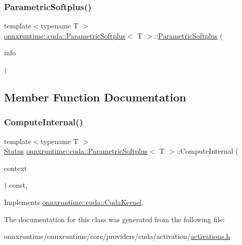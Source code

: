 \subsubsection{\texorpdfstring{Parametric\+Softplus()}{ParametricSoftplus()}}
{\footnotesize\ttfamily template$<$typename T $>$ \\
\mbox{\hyperlink{classonnxruntime_1_1cuda_1_1ParametricSoftplus}{onnxruntime\+::cuda\+::\+Parametric\+Softplus}}$<$ T $>$\+::\mbox{\hyperlink{classonnxruntime_1_1cuda_1_1ParametricSoftplus}{Parametric\+Softplus}} (\begin{DoxyParamCaption}\item[{const \mbox{\hyperlink{classonnxruntime_1_1OpKernelInfo}{Op\+Kernel\+Info}} \&}]{info }\end{DoxyParamCaption})\hspace{0.3cm}{\ttfamily [inline]}}



\subsection{Member Function Documentation}
\mbox{\label{classonnxruntime_1_1cuda_1_1ParametricSoftplus_a54e8cfd42bcdef992b1a3418d5a4df2d}} 
\subsubsection{\texorpdfstring{Compute\+Internal()}{ComputeInternal()}}
{\footnotesize\ttfamily template$<$typename T $>$ \\
\mbox{\hyperlink{classonnxruntime_1_1common_1_1Status}{Status}} \mbox{\hyperlink{classonnxruntime_1_1cuda_1_1ParametricSoftplus}{onnxruntime\+::cuda\+::\+Parametric\+Softplus}}$<$ T $>$\+::Compute\+Internal (\begin{DoxyParamCaption}\item[{\mbox{\hyperlink{classonnxruntime_1_1OpKernelContext}{Op\+Kernel\+Context}} $\ast$}]{context }\end{DoxyParamCaption}) const\hspace{0.3cm}{\ttfamily [override]}, {\ttfamily [virtual]}}



Implements \mbox{\hyperlink{classonnxruntime_1_1cuda_1_1CudaKernel_aca7af04ae448017d6023d30bba231ebb}{onnxruntime\+::cuda\+::\+Cuda\+Kernel}}.



The documentation for this class was generated from the following file\+:\begin{DoxyCompactItemize}
\item 
onnxruntime/onnxruntime/core/providers/cuda/activation/\mbox{\hyperlink{cuda_2activation_2activations_8h}{activations.\+h}}\end{DoxyCompactItemize}
